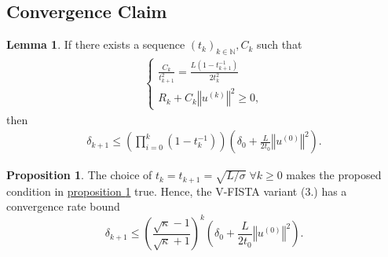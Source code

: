 \documentclass[]{article}
\theoremstyle{definition}
\newtheorem{prop}{Proposition}[section]  %
\newtheorem{lemma}{Lemma}[subsection]  %
\numberwithin{equation}{subsection}
\begin{document}
    \subsection{Convergence Claim}
        \begin{lemma}\label{lemma:convergence-prep}
            If there exists a sequence $(t_k)_{k\in \mathbb N}, C_k$ such that 
            \begin{align}
                \begin{cases}
                    \frac{C_k}{t_{k + 1}^2} = \frac{L(1 - t^{-1}_{k + 1})}{2t_{k}^2}
                    \\
                    R_k + C_k\left\Vert
                        u^{(k)}
                    \right\Vert^2 \ge 0, 
                \end{cases}
            \end{align}
            then 
            \begin{align*}
                \delta_{k + 1}
                \le 
                \left(
                    \prod_{i = 0}^{k} (1 - t_k^{-1})
                \right)\left(
                    \delta_0 + \frac{L}{2t_0}\left\Vert
                        u^{(0)}
                    \right\Vert^2
                \right). 
            \end{align*}
        \end{lemma}

        \begin{prop}
            The choice of $t_k = t_{k + 1} = \sqrt{L/\sigma}\; \forall k\ge 0$ makes the proposed condition in \hyperref[lemma:convergence-prep]{proposition \ref*{lemma:convergence-prep}} true. 
            Hence, the V-FISTA variant (3.) has a convergence rate bound 
            \[
                \delta_{k + 1}
                \le 
                \left(
                    \frac{\sqrt{\kappa} - 1}{\sqrt{\kappa} + 1}
                \right)^k\left(
                    \delta_0 + \frac{L}{2t_0}\left\Vert
                        u^{(0)}
                    \right\Vert^2
                \right).     
            \]
        \end{prop}


        
        
        
\end{document}
